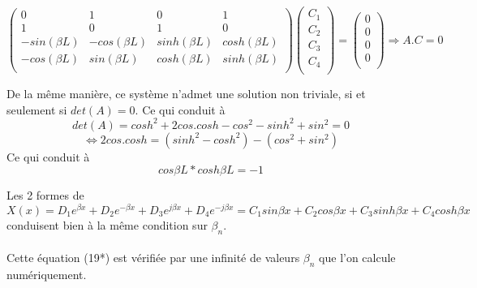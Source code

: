 \documentclass[a4paper,10pt]{article}
\begin{document}
\begin{equation} 
	\begin{pmatrix}
   	0 	& 1	& 0 	& 1	\\
   	 1 & 0	& 1	& 0	\\
  	 -sin(\beta L)	&-cos(\beta L)		&sinh(\beta L)		&cosh(\beta L)		\\
	-cos(\beta L)	&sin(\beta L)		&cosh(\beta L)		&sinh(\beta L)		\\
	\end{pmatrix} 
	\begin{pmatrix}
   	C_1 	\\
   	C_2	\\
  	C_3	\\
	C_4	\\
	\end{pmatrix} 
= 
	\begin{pmatrix}
   	0 	\\
   	0	\\
  	0	\\
	0	\\
	\end{pmatrix} 
	\Rightarrow
	A.C=0
\end{equation}

De la même manière, ce système n'admet une solution non triviale, si et seulement si \begin{math} det(A)=0 \end{math}. Ce qui conduit à 
\begin{equation} det(A) =cosh^2 + 2cos.cosh - cos^2 - sin  h^2 + sin^2 = 0   \end{equation}
\begin{equation}\iff 2cos.cosh = (sinh^2 - cosh^2) - (cos^2 + sin^2)   \end{equation}
Ce qui conduit à 
\begin{equation} cos\beta L * cosh \beta L = -1  \end{equation}

Les 2 formes de \begin{math} X(x) = D_1 e^{\beta x} +  D_2 e^{-\beta x} +  D_3 e^{j\beta x} +  D_4 e^{-j\beta x} =  C_1 sin{\beta x} +  C_2 cos{\beta x} +  C_3 sinh{\beta x} +  C_4 cosh{\beta x} \end{math} conduisent bien à la même condition sur \begin{math} \beta_n \end{math}.
\\\\
Cette équation (19*) est vérifiée par une infinité de valeurs \begin{math} \beta_n \end{math} que l'on calcule numériquement. 
\end{document}
